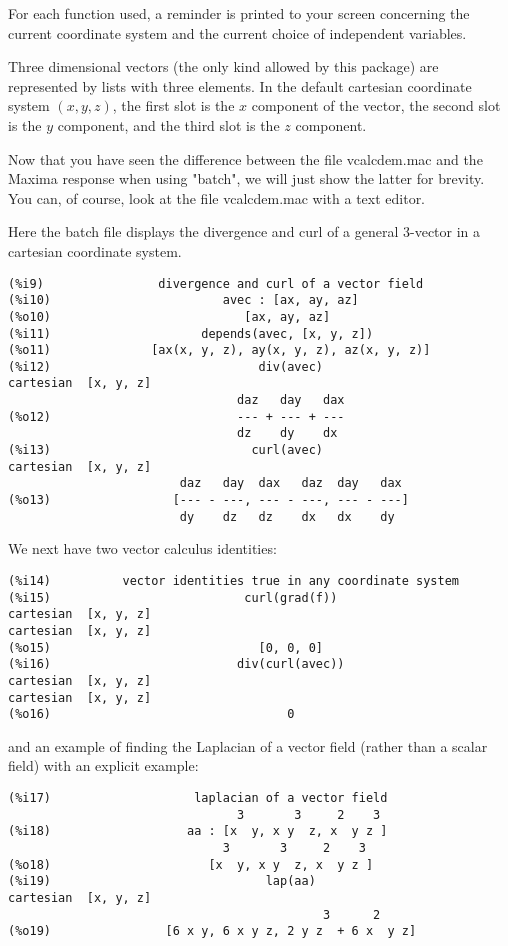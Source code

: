 \documentclass[12pt]{article}
\begin{document}
\smallskip
For each function used, a reminder is printed to your screen concerning the current
 coordinate system and the current choice of independent variables.

\smallskip
Three dimensional vectors (the only kind allowed by this package) are represented
  by lists with three elements.
In the default cartesian coordinate system $(x,y,z)$, the first slot is the
  $x$ component of the vector, the second slot is the $y$ component, and the
  third slot is the $z$ component.

\smallskip
Now that you have seen the difference between the file vcalcdem.mac and the
  Maxima response when using "batch", we will just show the latter for brevity.
You can, of course, look at the file vcalcdem.mac with a text editor.

\smallskip
Here the batch file displays the divergence and curl of a general 3-vector in a cartesian
  coordinate system.  
\small
\begin{verbatim}
(%i9)                divergence and curl of a vector field
(%i10)                        avec : [ax, ay, az]
(%o10)                           [ax, ay, az]
(%i11)                     depends(avec, [x, y, z])
(%o11)              [ax(x, y, z), ay(x, y, z), az(x, y, z)]
(%i12)                             div(avec)
cartesian  [x, y, z] 
                                daz   day   dax
(%o12)                          --- + --- + ---
                                dz    dy    dx
(%i13)                            curl(avec)
cartesian  [x, y, z] 
                        daz   day  dax   daz  day   dax
(%o13)                 [--- - ---, --- - ---, --- - ---]
                        dy    dz   dz    dx   dx    dy
\end{verbatim}
\normalsize
We next have two vector calculus identities:
\small
\begin{verbatim}
(%i14)          vector identities true in any coordinate system
(%i15)                           curl(grad(f))
cartesian  [x, y, z] 
cartesian  [x, y, z] 
(%o15)                             [0, 0, 0]
(%i16)                          div(curl(avec))
cartesian  [x, y, z] 
cartesian  [x, y, z] 
(%o16)                                 0
\end{verbatim}
\normalsize
\newpage
and an example of finding the Laplacian of a vector field (rather than a scalar field)
  with an explicit example:
\small
\begin{verbatim}
(%i17)                    laplacian of a vector field 
                                3       3     2    3
(%i18)                   aa : [x  y, x y  z, x  y z ]
                              3       3     2    3
(%o18)                      [x  y, x y  z, x  y z ]
(%i19)                              lap(aa)
cartesian  [x, y, z] 
                                            3      2
(%o19)                [6 x y, 6 x y z, 2 y z  + 6 x  y z]
\end{verbatim}
\end{document}
